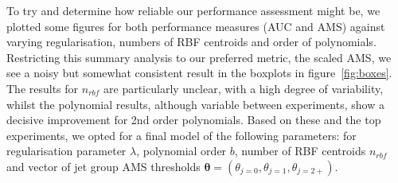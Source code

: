 

To try and determine how reliable our performance assessment might be, we plotted some figures for both performance measures (AUC and AMS) against varying regularisation, numbers of RBF centroids and order of polynomials. Restricting this summary analysis to our preferred metric, the scaled AMS, we see a noisy but somewhat consistent result in the boxplots in figure~\ref{fig:boxes}. The results for $n_{rbf}$ are particularly unclear, with a high degree of variability, whilst the polynomial results, although variable between experiments, show a decisive improvement for 2nd order polynomials. Based on these and the top experiments, we opted for a final model of the following parameters:
for regularisation parameter $\lambda$, polynomial order $b$, number of RBF centroids $n_{rbf}$ and vector of jet group AMS thresholds $\bm{\theta} = (\theta_{j=0}, \theta_{j=1}, \theta_{j=2+})$.

